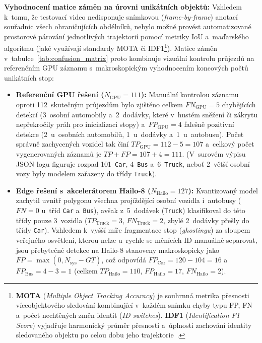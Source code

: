 \textbf{Vyhodnocení matice záměn na úrovni unikátních objektů:} Vzhledem k~tomu, že testovací video nedisponuje snímkovou (\textit{frame-by-frame}) anotací souřadnic všech ohraničujících obdélníků, nebylo možné provést automatizované prostorové párování jednotlivých trajektorií pomocí metriky \acs{IoU} a~maďarského algoritmu (jaké využívají standardy MOTA či IDF1\footnote{\textbf{MOTA} (\textit{Multiple Object Tracking Accuracy}) je souhrnná metrika přesnosti víceobjektového sledování kombinující v~každém snímku chyby typu FP, FN a~počet nechtěných změn identit (\textit{ID switches}). \textbf{IDF1} (\textit{Identification F1 Score}) vyjadřuje harmonický průměr přesnosti a~úplnosti zachování identity sledovaného objektu po celou dobu jeho trajektorie~\cite{pereira2022sort}.}). Matice záměn v~tabulce~\ref{tab:confusion_matrix} proto kombinuje vizuální kontrolu průjezdů na referenčním GPU záznamu s~makroskopickým vyhodnocením koncových počtů unikátních stop:
\begin{itemize}
    \item \textbf{Referenční GPU řešení ($N_{\text{GPU}} = 111$):} Manuální kontrolou záznamu oproti 112~skutečným průjezdům bylo zjištěno celkem $FN_{\text{GPU}} = 5$ chybějících detekcí (3~osobní automobily a~2~dodávky, které v~hustém sněžení či zákrytu nepřekročily práh pro inicializaci stopy) a~$FP_{\text{GPU}} = 4$ falešně pozitivní detekce (2~u~osobních automobilů, 1~u~dodávky a~1~u~autobusu). Počet správně zachycených vozidel tak činí $TP_{\text{GPU}} = 112 - 5 = 107$ a~celkový počet vygenerovaných záznamů je $TP + FP = 107 + 4 = 111$. (V~surovém výpisu JSON logu figuruje rozpad 101~\texttt{Car}, 4~\texttt{Bus} a~6~\texttt{Truck}, neboť 2~větší osobní vozy byly modelem zařazeny do třídy \texttt{Truck}).
    \item \textbf{Edge řešení s~akcelerátorem Hailo-8 ($N_{\text{Hailo}} = 127$):} Kvantizovaný model zachytil uvnitř polygonu všechna projíždějící osobní vozidla i~autobusy ($FN = 0$ u~tříd \texttt{Car} a~\texttt{Bus}), avšak z~5~dodávek (\texttt{Truck}) klasifikoval do této třídy pouze 3~vozidla ($TP_{\text{Truck}} = 3$, $FN_{\text{Truck}} = 2$, zbylé 2~dodávky přešly do třídy \texttt{Car}). Vzhledem k~vyšší míře fragmentace stop (\textit{ghostingu}) za sloupem veřejného osvětlení, kterou nelze u~rychle se měnících ID manuálně separovat, jsou přebytečné detekce na Hailo-8 stanoveny makroskopicky jako $FP = \max(0, N_{\text{sys}} - GT)$, což odpovídá $FP_{\text{Car}} = 120 - 104 = 16$ a~$FP_{\text{Bus}} = 4 - 3 = 1$ (celkem $TP_{\text{Hailo}} = 110$, $FP_{\text{Hailo}} = 17$, $FN_{\text{Hailo}} = 2$).
\end{itemize}

